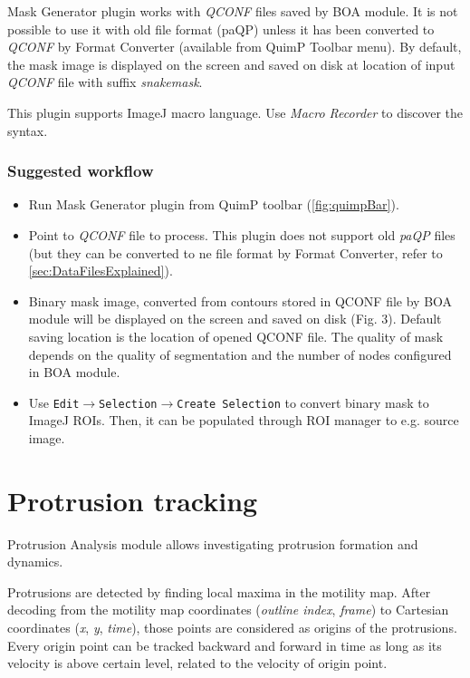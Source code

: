 \documentclass[a4paper,12pt]{article}
\begin{document}
Mask Generator plugin works with \textit{QCONF} files saved by BOA module. It is not possible to use it with old file format (paQP) unless it has been converted to \textit{QCONF} by Format Converter (available from QuimP Toolbar menu). By default, the mask image is displayed on the screen and saved on disk at location of input \textit{QCONF} file with suffix \textit{snakemask}.

This plugin supports ImageJ macro language. Use \textit{Macro Recorder} to discover the syntax.

\subsubsection{Suggested workflow}

\begin{itemize}
	\item Run Mask Generator plugin from QuimP toolbar (\autoref{fig:quimpBar}).
	\item Point to \textit{QCONF} file to process. This plugin does not support old \textit{paQP} files (but they can be converted to ne file format by Format Converter, refer to \autoref{sec:DataFilesExplained}).
	\item Binary mask image, converted from contours stored in QCONF file by BOA module will be displayed on the screen and saved on disk (Fig. 3). Default saving location is the location of opened QCONF file. The quality of mask depends on the quality of segmentation and the number of nodes configured in BOA module.
	\item Use \texttt{Edit$\rightarrow$Selection$\rightarrow$Create Selection} to convert binary mask to ImageJ ROIs. Then, it can be populated through ROI manager to e.g. source image.
\end{itemize}

\section{Protrusion tracking}
\label{sec:ProtTracking}

Protrusion Analysis module allows investigating protrusion formation and dynamics.

Protrusions are detected by finding local maxima in the motility map. After decoding from the motility map coordinates (\textit{outline index}, \textit{frame}) to Cartesian coordinates (\textit{x}, \textit{y}, \textit{time}), those points are considered as origins of the protrusions. Every origin point can be tracked backward and forward in time as long as its velocity is above certain level, related to the velocity of origin point.
\end{document}
